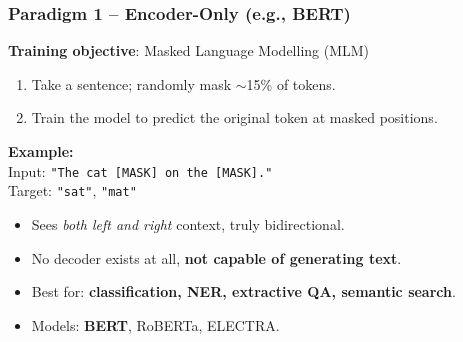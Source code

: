 
\begin{frame}[fragile]\frametitle{Paradigm 1 – Encoder-Only (e.g., BERT)}
    \textbf{Training objective}: Masked Language Modelling (MLM)
    \begin{enumerate}
    \item Take a sentence; randomly mask $\sim$15\% of tokens.
    \item Train the model to predict the original token at masked positions.
    \end{enumerate}
    \vspace{0.3em}
    \textbf{Example:}\\
    Input: \texttt{"The cat [MASK] on the [MASK]."}\\
    Target: \texttt{"sat"}, \texttt{"mat"}
    \vspace{0.3em}
    \begin{itemize}
    \item Sees \emph{both left and right} context,  truly bidirectional.
    \item No decoder exists at all,  \textbf{not capable of generating text}.
    \item Best for: \textbf{classification, NER, extractive QA, semantic search}.
    \item Models: \textbf{BERT}, RoBERTa, ELECTRA.
    \end{itemize}
\end{frame}


